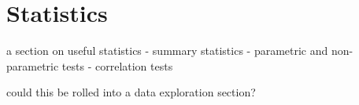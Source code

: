 
\section{Statistics} 
\label{advanced:statistics}

a section on useful statistics
- summary statistics
- parametric and non-parametric tests
- correlation tests



could this be rolled into a data exploration section?



